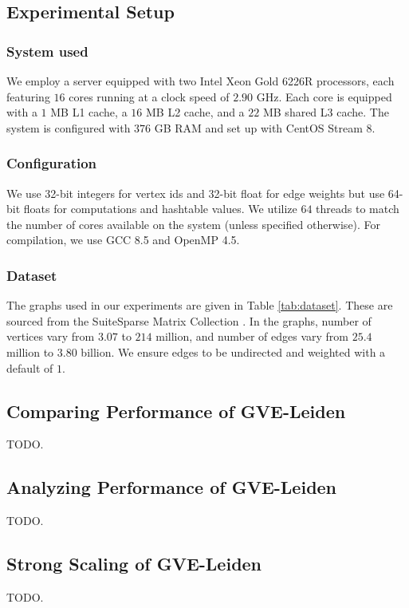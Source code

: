 \subsection{Experimental Setup}
\label{sec:setup}

\subsubsection{System used}

We employ a server equipped with two Intel Xeon Gold 6226R processors, each featuring $16$ cores running at a clock speed of $2.90$ GHz. Each core is equipped with a $1$ MB L1 cache, a $16$ MB L2 cache, and a $22$ MB shared L3 cache. The system is configured with $376$ GB RAM and set up with CentOS Stream 8.


\subsubsection{Configuration}

We use 32-bit integers for vertex ids and 32-bit float for edge weights but use 64-bit floats for computations and hashtable values. We utilize $64$ threads to match the number of cores available on the system (unless specified otherwise). For compilation, we use GCC 8.5 and OpenMP 4.5.


\subsubsection{Dataset}

The graphs used in our experiments are given in Table \ref{tab:dataset}. These are sourced from the SuiteSparse Matrix Collection \cite{suite19}. In the graphs, number of vertices vary from $3.07$ to $214$ million, and number of edges vary from $25.4$ million to $3.80$ billion. We ensure edges to be undirected and weighted with a default of $1$.


% 
% 




\subsection{Comparing Performance of GVE-Leiden}

TODO.

% 
% 





\subsection{Analyzing Performance of GVE-Leiden}

TODO.




\subsection{Strong Scaling of GVE-Leiden}

TODO.
